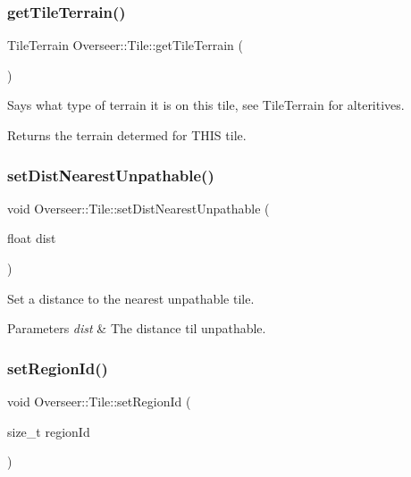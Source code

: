 \subsubsection{\texorpdfstring{get\+Tile\+Terrain()}{getTileTerrain()}}
{\footnotesize\ttfamily Tile\+Terrain Overseer\+::\+Tile\+::get\+Tile\+Terrain (\begin{DoxyParamCaption}{ }\end{DoxyParamCaption})}



Says what type of terrain it is on this tile, see Tile\+Terrain for alteritives. 

\begin{DoxyReturn}{Returns}
the terrain determed for T\+H\+IS tile. 
\end{DoxyReturn}
\mbox{\label{classOverseer_1_1Tile_a5a3b3f84b703b2cd5a9ae56b60e77b4c}} 
\subsubsection{\texorpdfstring{set\+Dist\+Nearest\+Unpathable()}{setDistNearestUnpathable()}}
{\footnotesize\ttfamily void Overseer\+::\+Tile\+::set\+Dist\+Nearest\+Unpathable (\begin{DoxyParamCaption}\item[{float}]{dist }\end{DoxyParamCaption})}



Set a distance to the nearest unpathable tile. 


\begin{DoxyParams}{Parameters}
{\em dist} & The distance til unpathable. \\
\hline
\end{DoxyParams}
\mbox{\label{classOverseer_1_1Tile_a8f0f9bc7bd55533a4df7cf2cafc08eaa}} 
\subsubsection{\texorpdfstring{set\+Region\+Id()}{setRegionId()}}
{\footnotesize\ttfamily void Overseer\+::\+Tile\+::set\+Region\+Id (\begin{DoxyParamCaption}\item[{size\+\_\+t}]{region\+Id }\end{DoxyParamCaption})}



